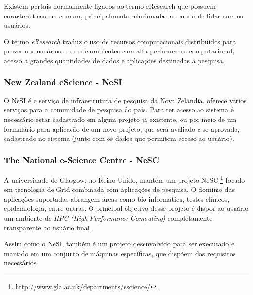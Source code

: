 \documentclass[tg]{mdtufsm}
\begin{document}
Existem portais normalmente ligados ao termo eResearch que possuem características em comum, principalmente relacionadas ao modo de lidar com os usuários.

O termo \emph{eResearch} traduz o uso de recursos computacionais distribuídos para prover aos usuários o uso de ambientes com alta performance computacional, acesso a grandes quantidades de dados e aplicações destinadas a pesquisa.
\subsubsection{New Zealand eScience - NeSI}
O NeSI é o serviço de infraestrutura de pesquisa da Nova Zelândia, oferece vários serviços para a comunidade de pesquisa do país. Para ter acesso ao sistema é necessário estar cadastrado em algum projeto já existente, ou por meio de um formulário para aplicação de um novo projeto, que será avaliado e se aprovado, cadastrado no sistema (junto com os dados que permitem acesso ao usuário).
\subsubsection {The National e-Science Centre - NeSC}
A universidade de Glasgow, no Reino Unido, mantém um projeto NeSC \footnote{\url{http://www.gla.ac.uk/departments/escience/}} focado em tecnologia de Grid combinada com aplicações de pesquisa. O domínio das aplicações suportadas abrangem áreas como bio-informática, testes clínicos, epidemiologia, entre outras. O principal objetivo desse projeto é dispor ao usuário um ambiente de \emph{HPC (High-Performance Computing)} completamente transparente ao usuário final. 
\item Assim como o NeSI, também é um projeto desenvolvido para ser executado e mantido em um conjunto de máquinas específicas, que dispõem dos requisitos necessários.

\fi
\end{document}
